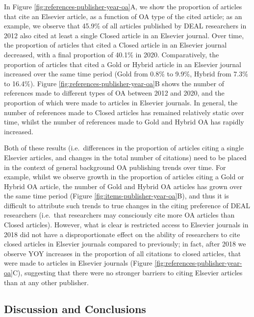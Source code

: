 \documentclass[
]{article}
\begin{document}
In Figure \ref{fig:references-publisher-year-oa}A, we show the proportion of articles that cite an Elsevier article, as a function of OA type of the cited article; as an example, we observe that 45.9\% of all articles published by DEAL researchers in 2012 also cited at least a single Closed article in an Elsevier journal. Over time, the proportion of articles that cited a Closed article in an Elsevier journal decreased, with a final proportion of 40.1\% in 2020. Comparatively, the proportion of articles that cited a Gold or Hybrid article in an Elsevier journal increased over the same time period (Gold from 0.8\% to 9.9\%, Hybrid from 7.3\% to 16.4\%). Figure \ref{fig:references-publisher-year-oa}B shows the number of references made to different types of OA between 2012 and 2020, and the proportion of which were made to articles in Elsevier journals. In general, the number of references made to Closed articles has remained relatively static over time, whilst the number of references made to Gold and Hybrid OA has rapidly increased.

Both of these results (i.e.~differences in the proportion of articles citing a single Elsevier articles, and changes in the total number of citations) need to be placed in the context of general background OA publishing trends over time. For example, whilst we observe growth in the proportion of articles citing a Gold or Hybrid OA article, the number of Gold and Hybrid OA articles has grown over the same time period (Figure \ref{fig:items-publisher-year-oa}B), and thus it is difficult to attribute such trends to true changes in the citing preference of DEAL researchers (i.e.~that researchers may consciously cite more OA articles than Closed articles). However, what is clear is restricted access to Elsevier journals in 2018 did not have a disproportionate effect on the ability of researchers to cite closed articles in Elsevier journals compared to previously; in fact, after 2018 we observe YOY increases in the proportion of all citations to closed articles, that were made to articles in Elsevier journals (Figure \ref{fig:references-publisher-year-oa}C), suggesting that there were no stronger barriers to citing Elsevier articles than at any other publisher.

\hypertarget{discussion-and-conclusions}{%
\subsection{Discussion and Conclusions}\label{discussion-and-conclusions}}
\end{document}

